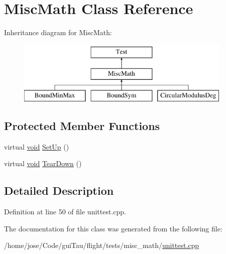 \hypertarget{class_misc_math}{\section{Misc\-Math Class Reference}
\label{class_misc_math}
}
Inheritance diagram for Misc\-Math\-:\begin{figure}[H]
\begin{center}
\leavevmode
\includegraphics[height=3.000000cm]{class_misc_math}
\end{center}
\end{figure}
\subsection*{Protected Member Functions}
\begin{DoxyCompactItemize}
\item 
virtual \hyperlink{group___n_a_m_e_ga18028b8badbf1ea7e704ccac3c488e82}{void} \hyperlink{group___unit_tests_gaf32e95ea690177429881d65ee89a43e2}{Set\-Up} ()
\item 
virtual \hyperlink{group___n_a_m_e_ga18028b8badbf1ea7e704ccac3c488e82}{void} \hyperlink{group___unit_tests_gaee049bdfbeb6e7117415c472da634038}{Tear\-Down} ()
\end{DoxyCompactItemize}


\subsection{Detailed Description}


Definition at line 50 of file unittest.\-cpp.



The documentation for this class was generated from the following file\-:\begin{DoxyCompactItemize}
\item 
/home/jose/\-Code/gui\-Tau/flight/tests/misc\-\_\-math/\hyperlink{misc__math_2unittest_8cpp}{unittest.\-cpp}\end{DoxyCompactItemize}
